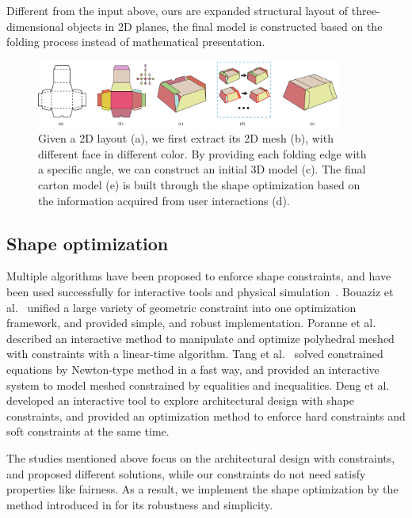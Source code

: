Different from the input above, ours are expanded structural layout of three-dimensional objects in 2D planes, the final model is constructed based on the folding process instead of mathematical presentation.

\begin{figure}
	\centering
	\includegraphics[width=0.9\textwidth]{images/overview}
	\caption{Given a 2D layout (a), we first extract its 2D mesh (b), with different face in different color. By providing each folding edge with a specific angle, we can construct an initial 3D model (c). The final carton model (e) is built through the shape optimization based on the information acquired from user interactions (d).}
	\label{fig:overview}
\end{figure} 

\subsection{Shape optimization}
Multiple algorithms have been proposed to enforce shape constraints, and have been used successfully for interactive tools and physical simulation~\cite{Botsch:2006:PCP:1281957.1281959,Igarashi:2005:ASM:1186822.1073323}. 
Bouaziz et al.~\cite{Bouaziz:2012:SSD:2346796.2346802} unified a large variety of geometric constraint into one optimization framework, and provided simple, and robust implementation. 
Poranne et al.~\cite{Poranne2013Interactive} described an interactive method to manipulate and optimize polyhedral meshed with constraints with a linear-time algorithm. 
Tang et al.~\cite{Tang:2014:FPM:2601097.2601213} solved constrained equations by Newton-type method in a fast way, and provided an interactive system to model meshed constrained by equalities and inequalities. 
Deng et al.~\cite{Deng2015} developed an interactive tool to explore architectural design with shape constraints, and provided an optimization method to enforce hard constraints and soft constraints at the same time. 

The studies mentioned above focus on the architectural design with constraints, and proposed different solutions, while our constraints do not need satisfy properties like fairness. As a result, we implement the shape optimization by the method introduced in \cite{Bouaziz:2012:SSD:2346796.2346802} for its robustness and simplicity.



